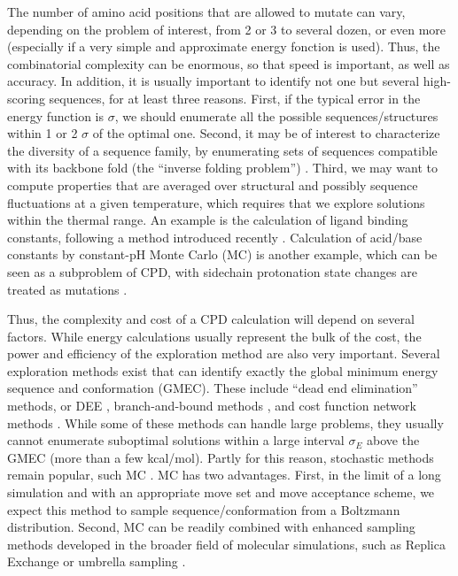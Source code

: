 The number of amino acid positions that are allowed to mutate can vary, depending on the problem of interest, from 2 or 3 to several dozen, or even more (especially if a very simple and approximate energy fonction is used).
Thus, the combinatorial complexity can be enormous, so that speed is important, as well as accuracy.
In addition, it is usually important to identify not one but several high-scoring sequences, for at least three reasons.
First, if the typical error in the energy function is $\sigma$, we should enumerate all the possible sequences/structures within 1 or 2 $\sigma$ of the optimal one.
Second, it may be of interest to characterize the diversity of a sequence family, by enumerating sets of sequences compatible with its backbone fold (the ``inverse folding problem'') \cite{Ponder87,Koehl02,Larson02,Schmidt09,Schmidt10}.
Third, we may want to compute properties that are averaged over structural and possibly sequence fluctuations at a given
temperature, which requires that we explore solutions within the thermal range.
An example is the calculation of ligand binding constants, following a method introduced recently \cite{Druart16,Polydorides16}.
Calculation of acid/base constants by constant-pH Monte Carlo (MC) is another example, which can be seen as a subproblem of CPD, with sidechain protonation state changes are treated as mutations \cite{Aleksandrov10,Polydorides13,Kilambi12}.

Thus, the complexity and cost of a CPD calculation will depend on several factors.
While energy calculations usually represent the bulk of the cost, the power and efficiency of the exploration method are also very important.
Several exploration methods exist that can identify exactly the global minimum energy sequence and conformation (GMEC).
These include ``dead end elimination'' methods, or DEE \cite{Looger01,Georgiev08}, branch-and-bound methods
\cite{Gordon99,Hong09}, and cost function network methods \cite{Traore13,Allouche14}.
While some of these methods can handle large problems, they usually cannot enumerate suboptimal solutions within a large interval $\sigma_E$ above the GMEC (more than a few kcal/mol).
Partly for this reason, stochastic methods remain popular, such MC \cite{Zou03,Samish11}.
MC has two advantages. First, in the limit of a long simulation and with an appropriate move set and move acceptance scheme, we expect this method to sample sequence/conformation from a Boltzmann distribution. Second, MC can be readily combined with enhanced sampling methods developed in the broader field of molecular simulations, such as Replica Exchange or umbrella sampling \cite{FrenkelBK,ChipotBK}. 

